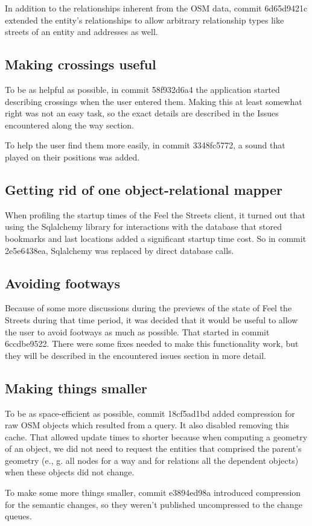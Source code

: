 \documentclass[nolof,digital]{fithesis3}
\begin{document}
In addition to the relationships inherent from the OSM data, commit 6d65d9421c extended the entity's relationships to allow arbitrary relationship types like streets of an entity and addresses as well. 
\subsection{Making crossings useful}
To be as helpful as possible, in commit 58f932d6a4 the application started describing crossings when the user entered them. Making this at least somewhat right was not an easy task, so the exact details are described in the Issues encountered along the way section.

To help the user find them more easily, in commit 3348fc5772, a sound that played on their positions was added.
\subsection{Getting rid of one object-relational mapper}
When profiling the startup times of the Feel the Streets client, it turned out that using the Sqlalchemy library for interactions with the database that stored bookmarks and last locations added a significant startup time cost. So in commit 2e5e6438ea, Sqlalchemy was replaced by direct database calls.
\subsection{Avoiding footways}
Because of some more discussions during the previews of the state of Feel the Streets during that time period, it was decided that it would be useful to allow the user to avoid footways as much as possible. That started in commit 6ccdbe9522. There were some fixes needed to make this functionality work, but they will be described in the encountered issues section in more detail.
\subsection{Making things smaller}
To be as space-efficient as possible, commit 18cf5ad1bd added compression for raw OSM objects which resulted from a query. It also disabled removing this cache. That allowed update times to shorter because when computing a geometry of an object, we did not need to request the entities that comprised the parent's geometry (e., g. all nodes for a way and for relations all the dependent objects) when these objects did not change.

To make some more things smaller, commit e3894ed98a introduced compression for the semantic changes, so they weren't published uncompressed to the change queues.
\end{document}
